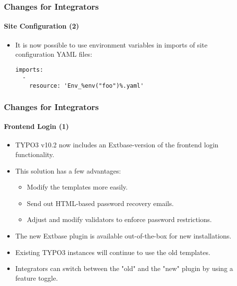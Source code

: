 \begin{frame}[fragile]
	\frametitle{Changes for Integrators}
	\framesubtitle{Site Configuration (2)}

	\lstset{basicstyle=\tiny\ttfamily}

	\begin{itemize}

		\item It is now possible to use environment variables in imports of site configuration YAML files:
\begin{lstlisting}
imports:
  -
    resource: 'Env_%env("foo")%.yaml'
\end{lstlisting}

	\end{itemize}

\end{frame}


\begin{frame}[fragile]
	\frametitle{Changes for Integrators}
	\framesubtitle{Frontend Login (1)}

	\begin{itemize}

		\item TYPO3 v10.2 now includes an Extbase-version of the frontend login functionality.
		\item This solution has a few advantages:

			\begin{itemize}
				\item Modify the templates more easily.
				\item Send out HTML-based password recovery emails.
				\item Adjust and modify validators to enforce password restrictions.
			\end{itemize}

		\item The new Extbase plugin is available out-of-the-box for new installations.
		\item Existing TYPO3 instances will continue to use the old templates.
		\item Integrators can switch between the "old" and the "new" plugin by using a feature toggle.

	\end{itemize}

\end{frame}

